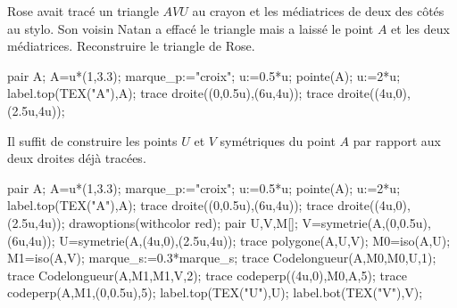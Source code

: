 \begin{exercice*}
   Rose avait tracé un triangle $AVU$ au crayon et les médiatrices de deux des côtés au stylo. Son voisin Natan a effacé le triangle mais a laissé le point $A$ et les deux médiatrices. Reconstruire le triangle de Rose.
   \begin{center}
      \begin{Geometrie}[CoinHD={(6u,5.5u)}]
         pair A;
         A=u*(1,3.3);
         marque_p:="croix";
         u:=0.5*u;
         pointe(A);
         u:=2*u;
         label.top(TEX("A"),A);
         trace droite((0,0.5u),(6u,4u));
         trace droite((4u,0),(2.5u,4u));
      \end{Geometrie}
   \end{center}
\end{exercice*}

\begin{corrige}
   Il suffit de construire les points $U$ et $V$ symétriques du point $A$ par rapport aux deux droites déjà tracées.
   \begin{center}
      \begin{Geometrie}[CoinHD={(6u,5.5u)}]
         pair A;
         A=u*(1,3.3);
         marque_p:="croix";
         u:=0.5*u;
         pointe(A);
         u:=2*u;
         label.top(TEX("A"),A);
         trace droite((0,0.5u),(6u,4u));
         trace droite((4u,0),(2.5u,4u));
         drawoptions(withcolor red);
         pair U,V,M[];
         V=symetrie(A,(0,0.5u),(6u,4u));
         U=symetrie(A,(4u,0),(2.5u,4u));
         trace polygone(A,U,V);
         M0=iso(A,U);
         M1=iso(A,V);
         marque_s:=0.3*marque_s;
         trace Codelongueur(A,M0,M0,U,1);
         trace Codelongueur(A,M1,M1,V,2);
         trace codeperp((4u,0),M0,A,5);
         trace codeperp(A,M1,(0,0.5u),5);
         label.top(TEX("U"),U);
         label.bot(TEX("V"),V);
      \end{Geometrie}
   \end{center}
\end{corrige}